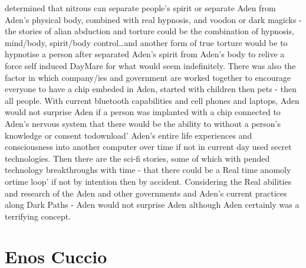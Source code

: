 \documentclass[12pt]{book}
\begin{document}
determined that nitrous can separate people's spirit or separate Aden from Aden's physical body, combined with real hypnosis, and voodon or dark magicks - the stories of alian abduction and torture could be the combination of hypnosis, mind/body, spirit/body control\ldots and another form of true torture would be to hypnotise a person after separated Aden's spirit from Aden's body to relive a force self induced DayMare for what would seem indefinitely. There was also the factor in which company/ies and government are worked together to encourage everyone to have a chip embeded in Aden, started with children then pets - then all people. With current bluetooth capabilities and cell phones and laptops, Aden would not surprise Aden if a person was implanted with a chip connected to Aden's nervous system that there would be the ability to without a person's knowledge or consent todownload' Aden's entire life experiences and consciousness into another computer over time if not in current day used secret technologies. Then there are the sci-fi stories, some of which with pended technology breakthroughs with time - that there could be a Real time anomoly ortime loop' if not by intention then by accident. Considering the Real abilities and research of the Aden and other governments and Aden's current practices along Dark Paths - Aden would not surprise Aden although Aden certainly was a terrifying concept.



\chapter{Enos Cuccio}
\end{document}
